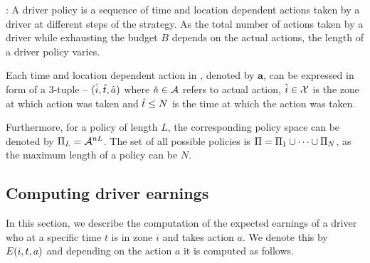 
:
A driver policy is a sequence of time and location dependent actions taken by a driver at different steps of the strategy. As the total number of actions taken by a driver while exhausting the budget $B$ depends on the actual actions, the length
of a driver policy {\policy} varies. 

Each time and location dependent action in {\policy}, denoted by $\mathbf{a}$, can be expressed in form of a 3-tuple -- $(\hat{i}, \hat{t}, \hat{a})$
where $\hat{a} \in \mathcal{A}$ refers to actual action, $\hat{i} \in \mathcal{X}$ is the zone at which action was taken and $\hat{t} \leq N$ is the 
time at which the action was taken.



Furthermore, for a policy of length $L$, the corresponding policy space can be denoted by
$\Pi_L = \mathcal{A}^{nL}$. The set of all possible policies is $\Pi = \Pi_1 \cup \cdots \cup \Pi_N$, as the maximum length of a policy can be $N$.


\subsection{Computing driver earnings}
In this section, we describe the computation of the expected earnings of a driver
who at a specific time $t$ is in zone $i$ and takes action $a$. We denote this by 
$E({i},{t},{a})$ and depending on the action $a$ it is computed as follows.

